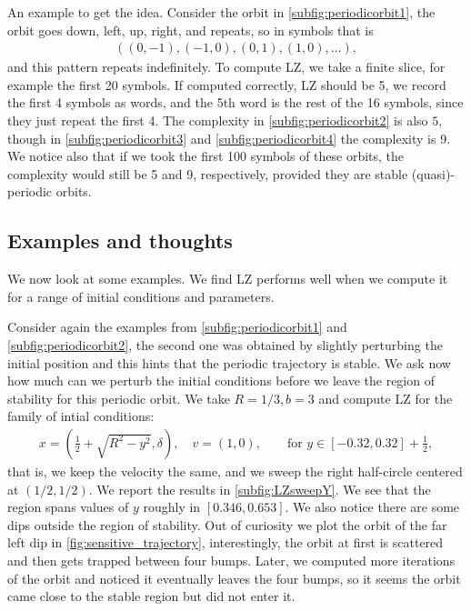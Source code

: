 An example to get the idea. Consider the orbit in \cref{subfig:periodicorbit1}, the orbit goes down, left, up, right, and repeats, so in symbols that is
\begin{align*}
((0,-1),(-1,0),(0,1),(1,0),\dots),
\end{align*}
and this pattern repeats indefinitely. To compute LZ, we take a finite slice, for example the first 20 symbols. If computed correctly, LZ should be 5, we record the first 4 symbols as words, and the 5th word is the rest of the 16 symbols, since they just repeat the first 4. The complexity in \cref{subfig:periodicorbit2} is also $5$, though in \cref{subfig:periodicorbit3} and \cref{subfig:periodicorbit4} the complexity is 9. We notice also that if we took the first 100 symbols of these orbits, the complexity would still be 5 and 9, respectively, provided they are stable (quasi)-periodic orbits.

\subsection{Examples and thoughts}

We now look at some examples. We find LZ performs well when we compute it for a range of initial conditions and parameters.

Consider again the examples from \cref{subfig:periodicorbit1} and \cref{subfig:periodicorbit2}, the second one was obtained by slightly perturbing the initial position and this hints that the periodic trajectory is stable. We ask now how much can we perturb the initial conditions before we leave the region of stability for this periodic orbit. We take $R=1/3, b=3$ and compute LZ for the family of intial conditions:
\begin{align*}
x= \left(\frac{1}{2}+\sqrt{R^2-y^2},\delta\right),\quad v = \left(1,0\right),\qquad \text{for } y\in [-0.32,0.32]+\frac{1}{2},
\end{align*} 
that is, we keep the velocity the same, and we sweep the right half-circle centered at $(1/2, 1/2)$. We report the results in \cref{subfig:LZsweepY}. We see that the region spans values of $y$ roughly in $[0.346, 0.653]$. We also notice there are some dips outside the region of stability. Out of curiosity we plot the orbit of the far left dip in \cref{fig:sensitive_trajectory}, interestingly, the orbit at first is scattered and then gets trapped between four bumps. Later, we computed more iterations of the orbit and noticed it eventually leaves the four bumps, so it seems the orbit came close to the stable region but did not enter it.

